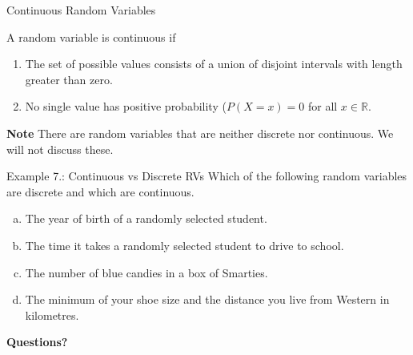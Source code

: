 \documentclass[aspectratio=169,xcolor=pdftex,dvipsnames,table]{beamer}\usepackage[]{graphicx}\usepackage[]{xcolor}
\newcounter{example}
\renewcommand{\example}
{\stepcounter{example}Example \lecturenum.\arabic{example}}
\newcommand{\lecturenum}{7}
\begin{document}
\begin{frame}
  \begin{block}{Continuous Random Variables}

    A random variable is continuous if
    \begin{enumerate}
    \item The set of possible values consists of a union of disjoint intervals with length greater than zero.
    \item No single value has positive probability ($P(X=x)=0$ for all $x \in \mathbb R$.
    \end{enumerate}

  \bigskip
  
  \textbf{Note}
  There are random variables that are neither discrete nor continuous. We will not discuss these.
  \end{block}
\end{frame}

\begin{frame}

  \begin{block}{\example: Continuous vs Discrete RVs}
    Which of the following random variables are discrete and which are continuous.

    \begin{enumerate}[a)]
    \item The year of birth of a randomly selected student.
    \item The time it takes a randomly selected student to drive to school. 
    \item The number of blue candies in a box of Smarties. 
    \item The minimum of your shoe size and the distance you live from Western in kilometres. 
    \end{enumerate}
  \end{block}
\end{frame}

\begin{frame}

\begin{center}
    \Large{\textbf{Questions?}}
  \end{center}
\end{frame}
\end{document}
